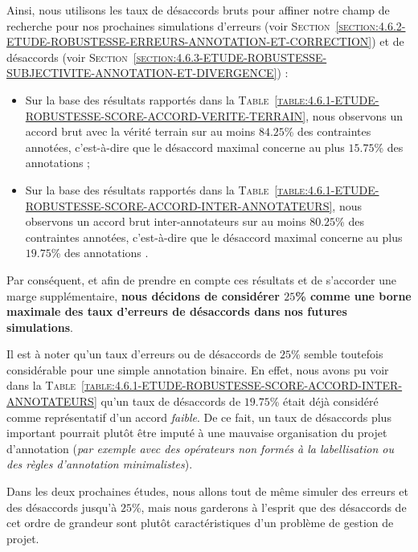 			Ainsi, nous utilisons les taux de désaccords bruts pour affiner notre champ de recherche pour nos prochaines simulations d'erreurs (voir \textsc{Section~\ref{section:4.6.2-ETUDE-ROBUSTESSE-ERREURS-ANNOTATION-ET-CORRECTION}}) et de désaccords (voir \textsc{Section~\ref{section:4.6.3-ETUDE-ROBUSTESSE-SUBJECTIVITE-ANNOTATION-ET-DIVERGENCE}}) :
			\begin{itemize}
				\item  Sur la base des résultats rapportés dans la \textsc{Table~\ref{table:4.6.1-ETUDE-ROBUSTESSE-SCORE-ACCORD-VERITE-TERRAIN}}, nous observons un accord brut avec la vérité terrain sur au moins $84.25$\% des contraintes annotées, c'est-à-dire que le désaccord maximal concerne au plus $15.75$\% des annotations ;
				\item Sur la base des résultats rapportés dans la \textsc{Table~\ref{table:4.6.1-ETUDE-ROBUSTESSE-SCORE-ACCORD-INTER-ANNOTATEURS}}, nous observons un accord brut inter-annotateurs sur au moins $80.25$\% des contraintes annotées, c'est-à-dire que le désaccord maximal concerne au plus $19.75$\% des annotations .
			\end{itemize}
			Par conséquent, et afin de prendre en compte ces résultats et de s'accorder une marge supplémentaire, \textbf{nous décidons de considérer $25$\% comme une borne maximale des taux d'erreurs de désaccords dans nos futures simulations}.
			
			\begin{leftBarAuthorOpinion}
				Il est à noter qu'un taux d'erreurs ou de désaccords de $25$\% semble toutefois considérable pour une simple annotation binaire.
				En effet, nous avons pu voir dans la \textsc{Table~\ref{table:4.6.1-ETUDE-ROBUSTESSE-SCORE-ACCORD-INTER-ANNOTATEURS}} qu'un taux de désaccords de $19.75$\% était déjà considéré comme représentatif d'un accord \textit{faible}.
				De ce fait, un taux de désaccords plus important pourrait plutôt être imputé à une mauvaise organisation du projet d'annotation (\textit{par exemple avec des opérateurs non formés à la labellisation ou des règles d'annotation minimalistes}).
				
				Dans les deux prochaines études, nous allons tout de même simuler des erreurs et des désaccords jusqu'à $25$\%, mais nous garderons à l'esprit que des désaccords de cet ordre de grandeur sont plutôt caractéristiques d'un problème de gestion de projet.
			\end{leftBarAuthorOpinion}
	
